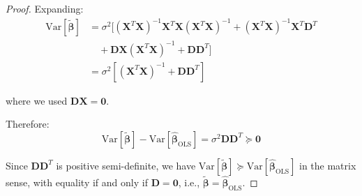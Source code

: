 \documentclass{article}
\begin{document}
\begin{proof}
Expanding:
\begin{align}
\text{Var}[\tilde{\boldsymbol{\beta}}] &= \sigma^2[(\mathbf{X}^T\mathbf{X})^{-1}\mathbf{X}^T\mathbf{X}(\mathbf{X}^T\mathbf{X})^{-1} + (\mathbf{X}^T\mathbf{X})^{-1}\mathbf{X}^T\mathbf{D}^T \\
&\quad + \mathbf{D}\mathbf{X}(\mathbf{X}^T\mathbf{X})^{-1} + \mathbf{D}\mathbf{D}^T] \\
&= \sigma^2[(\mathbf{X}^T\mathbf{X})^{-1} + \mathbf{D}\mathbf{D}^T]
\end{align}

where we used $\mathbf{D}\mathbf{X} = \mathbf{0}$.

Therefore:
\begin{equation}
\text{Var}[\tilde{\boldsymbol{\beta}}] - \text{Var}[\hat{\boldsymbol{\beta}}_{\text{OLS}}] = \sigma^2\mathbf{D}\mathbf{D}^T \succeq \mathbf{0}
\end{equation}

Since $\mathbf{D}\mathbf{D}^T$ is positive semi-definite, we have $\text{Var}[\tilde{\boldsymbol{\beta}}] \succeq \text{Var}[\hat{\boldsymbol{\beta}}_{\text{OLS}}]$ in the matrix sense, with equality if and only if $\mathbf{D} = \mathbf{0}$, i.e., $\tilde{\boldsymbol{\beta}} = \hat{\boldsymbol{\beta}}_{\text{OLS}}$.
\end{proof}
\end{document}
